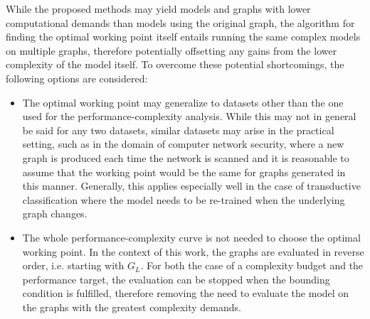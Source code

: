 While the proposed methods may yield models and graphs with lower computational demands than models using the original graph, the algorithm for finding the optimal working point itself entails running the same complex models on multiple graphs, therefore potentially offsetting any gains from the lower complexity of the model itself. To overcome these potential shortcomings, the following options are considered:
\begin{itemize}
  \item The optimal working point may generalize to datasets other than the one used for the performance-complexity analysis. While this may not in general be said for any two datasets, similar datasets may arise in the practical setting, such as in the domain of computer network security, where a new graph is produced each time the network is scanned and it is reasonable to assume that the working point would be the same for graphs generated in this manner. Generally, this applies especially well in the case of transductive classification where the model needs to be re-trained when the underlying graph changes.
  \item The whole performance-complexity curve is not needed to choose the optimal working point. In the context of this work, the graphs are evaluated in reverse order, i.e. starting with \( G_L \). For both the case of a complexity budget and the performance target, the evaluation can be stopped when the bounding condition is fulfilled, therefore removing the need to evaluate the model on the graphs with the greatest complexity demands.
\end{itemize}
